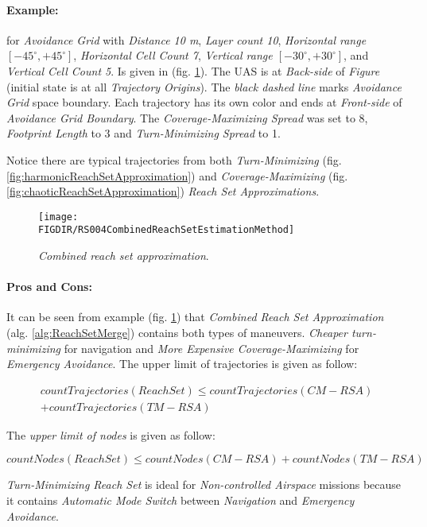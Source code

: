 \paragraph{Example:} for \emph{Avoidance Grid} with \emph{Distance 10 m}, \emph{Layer count 10}, \emph{Horizontal range $[-45^\circ,+45^\circ]$}, \emph{Horizontal Cell Count 7}, \emph{Vertical range $[-30^\circ,+30^\circ]$}, and \emph{Vertical Cell Count 5}. Is given in (fig. \ref{fig:combinedReachSetApproximation}). The UAS is at \emph{Back-side} of \emph{Figure} (initial state is at all \emph{Trajectory Origins}). The \emph{black dashed line} marks \emph{Avoidance Grid} space boundary. Each trajectory has its own color and ends at \emph{Front-side} of \emph{Avoidance Grid Boundary}. The \emph{Coverage-Maximizing Spread} was set to 8, \emph{Footprint Length} to 3 and \emph{Turn-Minimizing Spread} to 1.

\begin{note}
    Notice there are typical trajectories from both \emph{Turn-Minimizing} (fig. \ref{fig:harmonicReachSetApproximation}) and \emph{Coverage-Maximizing} (fig. \ref{fig:chaoticReachSetApproximation}) \emph{Reach Set Approximations}.
\end{note}

\begin{figure}[H]
    \centering
    \texttt{[image: \\FIGDIR/RS004CombinedReachSetEstimationMethod]} 
    \caption{\emph{Combined \emph{reach set} approximation}.}
    \label{fig:combinedReachSetApproximation}
\end{figure}


\paragraph{Pros and Cons:} It can be seen from example (fig. \ref{fig:combinedReachSetApproximation}) that \emph{Combined Reach Set Approximation} (alg. \ref{alg:ReachSetMerge}) contains both types of maneuvers. \emph{Cheaper turn-minimizing} for navigation and \emph{More Expensive Coverage-Maximizing} for \emph{Emergency Avoidance}. The upper limit of trajectories is given as follow:

\begin{multline}
    countTrajectories(ReachSet) \le countTrajectories(CM-RSA) \\+ countTrajectories(TM-RSA)
\end{multline}

\noindent The \emph{upper limit of nodes} is given as follow:

\begin{equation}
    countNodes(ReachSet) \le countNodes(CM-RSA)+ countNodes(TM-RSA)
\end{equation}

\noindent \emph{Turn-Minimizing Reach Set} is ideal for \emph{Non-controlled Airspace} missions because it contains \emph{Automatic Mode Switch} between \emph{Navigation} and \emph{Emergency Avoidance}.


